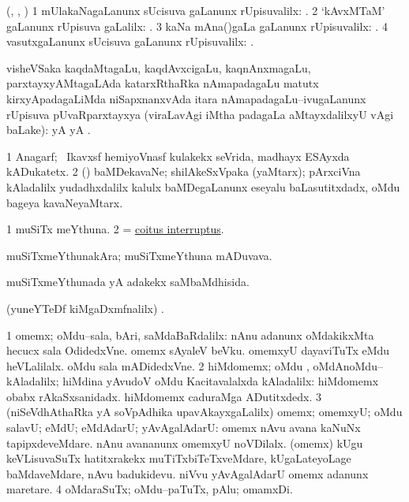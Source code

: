 \bentry
{}
\gl{\uparx}
\bmng
(\Bwvi, \jiVra, \ravi) 
\bnum
\num{1} mUlakaNagaLanunx sUcisuva \nA gaLanunx rUpisuvalilx: . 
\num{2} `kAvxMTaM' gaLanunx rUpisuva \nA gaLalilx: . 
\num{3} kaNa mAna()gaLa \nA gaLanunx rUpisuvalilx: . 
\num{4} vasutxgaLanunx sUcisuva \nA gaLanunx rUpisuvalilx: . 
\enum
\emng
\eentry

\bentry
{}
\gl{\pUparx}
\bmng
visheVSaka kaqdaMtagaLu, kaqdAvxcigaLu, kaqnAnxmagaLu,  parxtayxyAMtagaLAda katarxRthaRka nAmapadagaLu matutx kirxyApadagaLiMda niSapxnanxvAda itara nAmapadagaLu--ivugaLanunx rUpisuva pUvaRparxtayxya (viraLavAgi iMtha padagaLa aMtayxdalilxyU \uparx vAgi baLake):  yA  yA . 
\emng
\eentry

\bentry
{}
\gl{\nA}
\bmng
\bnum
\num{1} Anagarf; \kanmu\ Ikavxsf hemiyoVnasf kulakekx seVrida, madhayx ESAyxda kADukatetx.  
\num{2} (\ca) baMDekavaNe; shilAkeSxVpaka (yaMtarx); pArxciVna kAladalilx yudadhxdalilx kalulx baMDegaLanunx eseyalu baLasutitxdadx, oMdu bageya kavaNeyaMtarx. 
\enum
\emng
\eentry

\bentry
{}
\gl{\nA}
\bmng
\bnum
\num{1} muSiTx meYthuna. 
\num{2} = \hyperref{kandict_c.pdf}{C}{coitus interruptus}{coitus interruptus}. 
\enum
\emng
\eentry

\bentry
{}
\gl{\nA}
\bmng
muSiTxmeYthunakAra; muSiTxmeYthuna mADuvava. 
\emng
\eentry

\bentry
{}
\gl{\gu}
\bmng
muSiTxmeYthunada yA adakekx saMbaMdhisida. 
\emng
\eentry

\bentry
{}
\gl{\saMkiSx}
\bmng
(yuneYTeDf kiMgaDxmfnalilx) . 
\emng
\eentry

\bentry
{}
\gl{\kirxvi}
\bmng
\bnum
\num{1} omemx; oMdu--sala, bAri, saMdaBaRdalilx:  nAnu adanunx oMdakikxMta hecucx sala OdidedxVne.  omemx sAyaleV beVku.  omemxyU dayaviTuTx eMdu heVLalilalx.  oMdu sala mADidedxVne. 
\num{2} hiMdomemx; oMdu , oMdAnoMdu--kAladalilx; hiMdina yAvudoV oMdu Kacitavalalxda kAladalilx:  hiMdomemx obabx rAkaSxsanidadx.  hiMdomemx caduraMga ADutitxdedx. 
\num{3} (niSeVdhAthaRka yA soVpAdhika upavAkayxgaLalilx) omemx; omemxyU; oMdu salavU; eMdU; eMdAdarU; yAvAgalAdarU:  omemx nAvu avana kaNuNx tapipxdeveMdare.  nAnu avananunx omemxyU noVDilalx.  (omemx) kUgu keVLisuvaSuTx hatitxrakekx muTiTxbiTeTxveMdare, kUgaLateyoLage baMdaveMdare, nAvu badukidevu.  niVvu yAvAgalAdarU omemx adanunx maretare. 
\num{4} oMdaraSuTx; oMdu--paTuTx, pAlu; omamxDi. 
\enum
\emng

